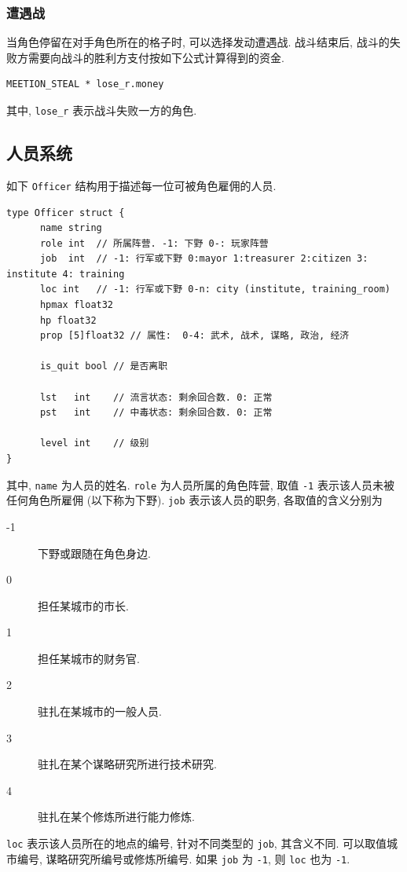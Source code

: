 \documentclass[UTF8, zihao=-4]{ctexart} %
\newcommand{\lcode}{\lstinline} % 段内插入代码
\begin{document}
\subsubsection{遭遇战}
当角色停留在对手角色所在的格子时, 可以选择发动遭遇战. 
战斗结束后, 战斗的失败方需要向战斗的胜利方支付按如下公式计算得到的资金.
\begin{lstlisting}
MEETION_STEAL * lose_r.money
\end{lstlisting}
其中, \lcode{lose_r} 表示战斗失败一方的角色.

\subsection{人员系统}
\label{s_people}
如下 \lcode{Officer} 结构用于描述每一位可被角色雇佣的人员.
\begin{lstlisting}
type Officer struct {
      name string
      role int  // 所属阵营. -1: 下野 0-: 玩家阵营                                            
      job  int  // -1: 行军或下野 0:mayor 1:treasurer 2:citizen 3: institute 4: training      
      loc int   // -1: 行军或下野 0-n: city (institute, training_room)                        
      hpmax float32
      hp float32
      prop [5]float32 // 属性:  0-4: 武术, 战术, 谋略, 政治, 经济

      is_quit bool // 是否离职

      lst   int    // 流言状态: 剩余回合数. 0: 正常
      pst   int    // 中毒状态: 剩余回合数. 0: 正常

      level int    // 级别
}
\end{lstlisting}
其中, \lcode{name} 为人员的姓名. \lcode{role} 为人员所属的角色阵营, 取值 \lcode{-1} 表示该人员未被任何角色所雇佣 (以下称为下野).
\lcode{job} 表示该人员的职务, 各取值的含义分别为
\begin{description}
      \item [-1] 下野或跟随在角色身边.
      \item [0] 担任某城市的市长.
      \item [1] 担任某城市的财务官.
      \item [2] 驻扎在某城市的一般人员.
      \item [3] 驻扎在某个谋略研究所进行技术研究.
      \item [4] 驻扎在某个修炼所进行能力修炼.
\end{description}
\lcode{loc} 表示该人员所在的地点的编号, 针对不同类型的 \lcode{job}, 其含义不同.
可以取值城市编号, 谋略研究所编号或修炼所编号. 如果 \lcode{job} 为 \lcode{-1}, 
则 \lcode{loc} 也为 \lcode{-1}.
\end{document}
